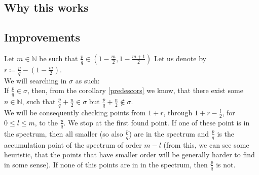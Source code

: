 \subsection{Why this works}
\subsection{Improvements}
Let $m \in \mathbb{N}$ be such that $\frac{p}{q} \in (1-\frac{m}{2},1-
\frac{m+1}{2})$
Let us denote by $r \coloneqq \frac{p}{q} - (1-\frac{m}{2})$. \\ 

We will searching in $\sigma$ as such: \\

If $\frac{p}{q} \in \sigma$, then, from the corollary \ref{predescors} we know, that there 
exist some $n \in \mathbb{N}$, such that $\frac{p}{q} + \frac{n}{2} \in \sigma$ but 
$\frac{p}{q} + \frac{n}{2} \not\in \sigma$. \\

We will be consequently checking points from $1+r$, through $1+r-\frac{l}{2}$, for 
$0 \leq l \leq m$, to the $\frac{p}{q}$. We stop at the first found point. 
If one of these point is in the spectrum, then all smaller (so also $\frac{p}{q}$) are in 
the spectrum and $\frac{p}{q}$ is the accumulation point of the spectrum of order $m-l$ 
(from this, 
 we can see some heuristic, that the points that have smaller order will be generally 
harder to find in some sense). If none of this points are in in the spectrum, then $\frac{p}{q}$ 
is not.






